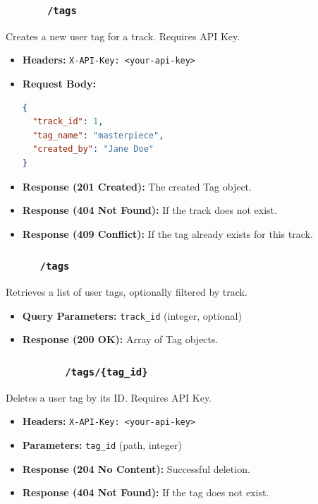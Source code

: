 \documentclass[11pt,a4paper]{article}
\newcommand{\methodGET}{\colorbox{getcolor}{\textcolor{white}{\textbf{GET}}}}
\newcommand{\methodPOST}{\colorbox{postcolor}{\textcolor{white}{\textbf{POST}}}}
\newcommand{\methodDELETE}{\colorbox{deletecolor}{\textcolor{white}{\textbf{DELETE}}}}
\begin{document}
\subsubsection*{\methodPOST \texttt{ /tags}}
Creates a new user tag for a track. Requires API Key.
\begin{itemize}[label=\textcolor{primary}{\textbullet}, noitemsep]
    \item \textbf{Headers:} \texttt{X-API-Key: <your-api-key>}
    \item \textbf{Request Body:}
\begin{lstlisting}[language=json]
{
  "track_id": 1,
  "tag_name": "masterpiece",
  "created_by": "Jane Doe"
}
\end{lstlisting}
    \item \textbf{Response (201 Created):} The created Tag object.
    \item \textbf{Response (404 Not Found):} If the track does not exist.
    \item \textbf{Response (409 Conflict):} If the tag already exists for this track.
\end{itemize}

\subsubsection*{\methodGET \texttt{ /tags}}
Retrieves a list of user tags, optionally filtered by track.
\begin{itemize}[label=\textcolor{primary}{\textbullet}, noitemsep]
    \item \textbf{Query Parameters:} \texttt{track\_id} (integer, optional)
    \item \textbf{Response (200 OK):} Array of Tag objects.
\end{itemize}

\subsubsection*{\methodDELETE \texttt{ /tags/\{tag\_id\}}}
Deletes a user tag by its ID. Requires API Key.
\begin{itemize}[label=\textcolor{primary}{\textbullet}, noitemsep]
    \item \textbf{Headers:} \texttt{X-API-Key: <your-api-key>}
    \item \textbf{Parameters:} \texttt{tag\_id} (path, integer)
    \item \textbf{Response (204 No Content):} Successful deletion.
    \item \textbf{Response (404 Not Found):} If the tag does not exist.
\end{itemize}
\end{document}
